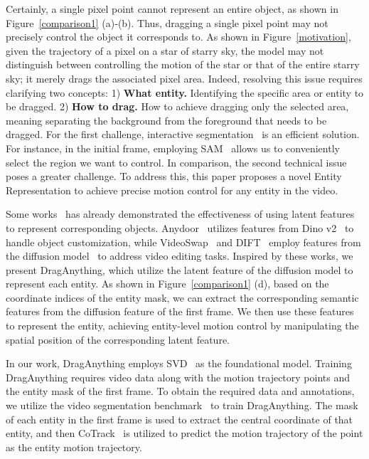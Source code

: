 \documentclass[runningheads]{llncs}
\newcommand{\ours}{\textup{DragAnything}\xspace}
\begin{document}
Certainly, a single pixel point cannot represent an entire object, as shown in Figure~\ref{comparison1} (a)-(b).
%
Thus, dragging a single pixel point may not precisely control the object it corresponds to.
%
As shown in Figure~\ref{motivation}, 
%
given the trajectory of a pixel on a star of starry sky, the model may not distinguish between controlling the motion of the star or that of the entire starry sky; it merely drags the associated pixel area.
%
Indeed, resolving this issue requires clarifying two concepts: 1) \textbf{What entity.} Identifying the specific area or entity to be dragged. 
%
2) \textbf{How to drag.} How to achieve dragging only the selected area, meaning separating the background from the foreground that needs to be dragged.
%
For the first challenge, interactive segmentation~\cite{kirillov2023segment,wang2023seggpt} is an efficient solution.
%
For instance, in the initial frame, employing SAM~\cite{kirillov2023segment} allows us to conveniently select the region we want to control.
%
In comparison, the second technical issue poses a greater challenge. 
%
To address this, this paper proposes a novel Entity Representation to achieve precise motion control for any entity in the video.


Some works~\cite{chen2023anydoor,gu2023videoswap,tang2024emergent} has already demonstrated the effectiveness of using latent features to represent corresponding objects.
%
Anydoor~\cite{chen2023anydoor} utilizes features from Dino v2~\cite{oquab2023dinov2} to handle object customization, while VideoSwap~\cite{gu2023videoswap} and DIFT~\cite{tang2024emergent} employ features from the diffusion model~\cite{rombach2022high} to address video editing tasks.
%
Inspired by these works, we present \ours , which utilize the latent feature of the diffusion model to represent each entity.
%
As shown in Figure~\ref{comparison1} (d), based on the coordinate indices of the entity mask, we can extract the corresponding semantic features from the diffusion feature of the first frame. 
%
We then use these features to represent the entity, achieving entity-level motion control by manipulating the spatial position of the corresponding latent feature.

In our work, \ours employs SVD~\cite{blattmann2023stable} as the foundational model. 
%
Training \ours requires video data along with the motion trajectory points and the entity mask of the first frame. 
%
To obtain the required data and annotations, we utilize the video segmentation benchmark~\cite{miao2022large} to train \ours.
%
The mask of each entity in the first frame is used to extract the central coordinate of that entity, and then CoTrack~\cite{karaev2023cotracker} is utilized to predict the motion trajectory of the point as the entity motion trajectory.
\end{document}
